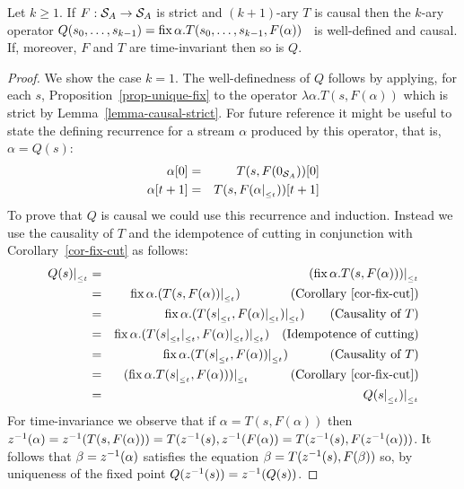 \begin{corollary}\label{feedback-semantics}
\label{cor-loop}
Let $k\geq1$. If $F: \mathcal{S}_{A} \to \mathcal{S}_{A}$ is strict and $(k+1)$-ary $T$ is causal then the $k$-ary
operator $Q(s_0,\ldots,s_{k-1})=\mbox{fix}\,\alpha.T(s_0,\ldots,s_{k-1},F(\alpha))$~ is well-defined and causal. 
If, moreover, $F$ and $T$ are time-invariant then so is $Q$.
\end{corollary}
\begin{proof} We show the case $k=1$.
The well-definedness of $Q$ follows by applying, for each $s$, Proposition~\ref{prop-unique-fix}
to the operator
$\lambda\alpha.T(s,F(\alpha))$ which is strict by Lemma~\ref{lemma-causal-strict}.
For future reference it might be useful to state the defining recurrence for a stream $\alpha$ 
produced by this operator, that is, $\alpha=Q(s)$:
\begin{eqnarray*}
\alpha[0] & = &  T(s,F(0_{\mathcal{S}_{A}}))[0]\\
\alpha[t+1] & = & T(s,F(\alpha|_{_{\leq t}}))[t+1]
\end{eqnarray*}
To prove that $Q$ is causal we could use this recurrence and induction. Instead 
we use the causality of $T$ and the idempotence of cutting in conjunction with
Corollary~\ref{cor-fix-cut} as follows:
\begin{eqnarray*}
Q(s)|_{_{\leq t}} & = &  (\mbox{fix}\,\alpha.T(s,F(\alpha)))|_{_{\leq t}}\\
         & = &  \mbox{fix}\,\alpha.(T(s,F(\alpha))|_{_{\leq t}})~~~~~~~~~~~~\mbox{(Corollary~\ref{cor-fix-cut})}\\
         & = &  \mbox{fix}\,\alpha.(T(s|_{_{\leq t}},F(\alpha)|_{_{\leq t}})|_{_{\leq t}})~~~~~~\mbox{(Causality of $T$)}\\
         & = &  \mbox{fix}\,\alpha.(T(s|_{_{\leq t}}|_{_{\leq t}},F(\alpha)|_{_{\leq t}})|_{_{\leq t}})~~~\mbox{(Idempotence of cutting)}\\
         & = &  \mbox{fix}\,\alpha.(T(s|_{_{\leq t}},F(\alpha))|_{_{\leq t}})~~~~~~~~~~\mbox{(Causality of $T$)}\\
         & = & (\mbox{fix}\,\alpha.T(s|_{_{\leq t}},F(\alpha)))|_{_{\leq t}}~~~~~~~~~~\mbox{(Corollary~\ref{cor-fix-cut})}\\
         & = & Q(s|_{_{\leq t}})|_{_{\leq t}}
\end{eqnarray*}
For time-invariance we observe that if $\alpha=T(s,F(\alpha))$ then $z^{-1}(\alpha)= z^{-1}(T(s,F(\alpha)))=T(z^{-1}(s),z^{-1}(F(\alpha))= 
T(z^{-1}(s),F(z^{-1}(\alpha)))$. It follows that $\beta=z^{-1}(\alpha)$ satisfies the equation $\beta=T(z^{-1}(s),F(\beta))$ so, 
by uniqueness of the fixed point $Q(z^{-1}(s))=z^{-1}(Q(s))$.
\end{proof}



